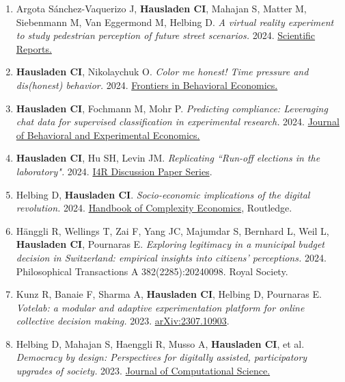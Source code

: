 \documentclass[11pt]{article}
\begin{document}
\begin{enumerate}[parsep=0pt]
\item Argota Sánchez-Vaquerizo J, \textbf{Hausladen CI}, Mahajan S, Matter M, Siebenmann M, Van Eggermond M, Helbing D. {\em A virtual reality experiment to study pedestrian perception of future street scenarios.} 2024.
\href{https://doi.org/10.1038/s41598-024-55073-x}{Scientific Reports.}

\item \textbf{Hausladen CI}, Nikolaychuk O. {\em Color me honest! Time pressure and dis(honest) behavior.} 2024.  
\href{https://doi.org/10.3389/frbhe.2023.1337312}{Frontiers in Behavioral Economics.}  

\item \textbf{Hausladen CI}, Fochmann M, Mohr P. {\em Predicting compliance: Leveraging chat data for supervised classification in experimental research.} 2024.  
\href{https://doi.org/10.1016/j.socec.2024.102164}{Journal of Behavioral and Experimental Economics.}  

\item \textbf{Hausladen CI}, Hu SH, Levin JM. {\em Replicating ``Run-off elections in the laboratory".} 2024. \href{https://www.econstor.eu/bitstream/10419/281134/1/I4R-DP099.pdf}{I4R Discussion Paper Series}.

\item Helbing D, \textbf{Hausladen CI}. {\em Socio-economic implications of the digital revolution.} 2024.  
\href{https://www.taylorfrancis.com/books/edit/10.4324/9781003119128/routledge-international-handbook-complexity-economics-ping-chen-wolfram-elsner-andreas-pyka}{Handbook of Complexity Economics}, Routledge. 

\item Hänggli R, Wellings T, Zai F, Yang JC, Majumdar S, Bernhard L, Weil L, \textbf{Hausladen CI}, Pournaras E. {\em Exploring legitimacy in a municipal budget decision in Switzerland: empirical insights into citizens’ perceptions.} 2024. Philosophical Transactions A 382(2285):20240098. Royal Society.

\item Kunz R, Banaie F, Sharma A, \textbf{Hausladen CI}, Helbing D, Pournaras E. {\em Votelab: a modular and adaptive experimentation platform for online collective decision making.} 2023. \href{https://arxiv.org/pdf/2307.10903}{arXiv:2307.10903}.

\item Helbing D, Mahajan S, Haenggli R, Musso A, \textbf{Hausladen CI}, et al. {\em Democracy by design: Perspectives for digitally assisted, participatory upgrades of society.} 2023.  
\href{https://doi.org/10.1016/j.jocs.2023.102061}{Journal of Computational Science.} 


\end{enumerate}
\end{document}
